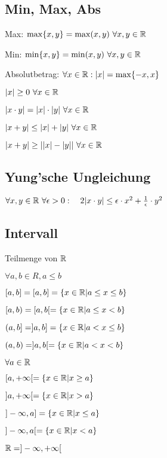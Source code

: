 \subsection{Min, Max, Abs}
\begin{compactdesc}
    \item[Max:] $\max \{x,y\} = \max(x, y) \ \forall x,y \in \mathbb{R}$
    \item[Min:] $\min \{x,y\} = \min(x, y) \ \forall x,y \in \mathbb{R}$
    \item[Absolutbetrag:] $\forall x \in \mathbb{R}: |x| = \max \{-x, x\} $
    \begin{compactenum}
        \item $|x| \ge 0 \ \forall x \in \mathbb{R}$
        \item $|x \cdot y| = |x| \cdot |y| \ \forall x \in \mathbb{R}$
        \item $|x + y| \le |x| + |y| \ \forall x \in \mathbb{R}$
        \item $|x + y| \ge ||x| - |y|| \ \forall x \in \mathbb{R}$
    \end{compactenum} 
\end{compactdesc}

\subsection{Yung'sche Ungleichung}
$\forall x,y \in \mathbb{R} \ \forall \epsilon > 0: \quad 2|x \cdot  y| \le \epsilon \cdot  x^2 + \frac{1}{\epsilon} \cdot y^2$

\subsection{Intervall}
Teilmenge von $\mathbb{R}$
\begin{compactenum}
    \item $\forall a,b \in R, a \le b$
        \begin{compactenum}
            \item $[a,b] = [a, b] = \{x \in \mathbb{R} | a \le  x \le b\} $
            \item $[a,b) = [a, b[ = \{x \in \mathbb{R} | a \le  x < b\} $ 
            \item $(a,b] = ]a, b] = \{x \in \mathbb{R} | a <  x \le b\} $
            \item $(a,b) = ]a, b[ = \{x \in \mathbb{R} | a <  x < b\} $
        \end{compactenum}
    \item $\forall  a \in \mathbb{R}$
        \begin{compactenum}
            \item $[a, +\infty[ = \{x \in \mathbb{R} | x \geq a\} $
            \item $]a, +\infty[ = \{x \in \mathbb{R} | x > a\} $
            \item $]-\infty, a] = \{x \in \mathbb{R} | x \le a\} $
            \item $]-\infty, a[ = \{x \in \mathbb{R} | x < a\} $
        \end{compactenum}
    \item $\mathbb{R} = ]-\infty, +\infty[$
\end{compactenum}

